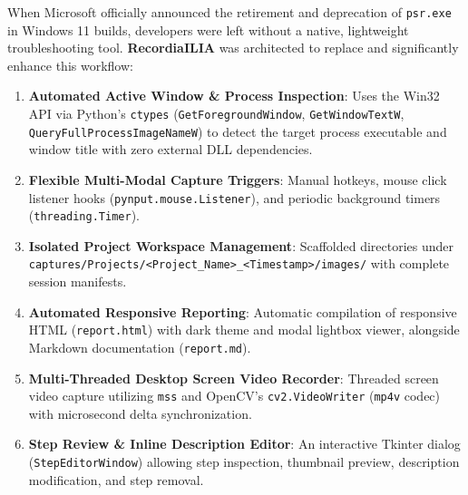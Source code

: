 \documentclass[10pt,a4paper]{article}
\begin{document}
When Microsoft officially announced the retirement and deprecation of \texttt{psr.exe} in Windows 11 builds, developers were left without a native, lightweight troubleshooting tool. \textbf{RecordiaILIA} was architected to replace and significantly enhance this workflow:
\begin{enumerate}
    \item \textbf{Automated Active Window \& Process Inspection}: Uses the Win32 API via Python's \texttt{ctypes} (\texttt{GetForegroundWindow}, \texttt{GetWindowTextW}, \texttt{QueryFullProcessImageNameW}) to detect the target process executable and window title with zero external DLL dependencies.
    \item \textbf{Flexible Multi-Modal Capture Triggers}: Manual hotkeys, mouse click listener hooks (\texttt{pynput.mouse.Listener}), and periodic background timers (\texttt{threading.Timer}).
    \item \textbf{Isolated Project Workspace Management}: Scaffolded directories under \texttt{captures/Projects/<Project\_Name>\_<Timestamp>/images/} with complete session manifests.
    \item \textbf{Automated Responsive Reporting}: Automatic compilation of responsive HTML (\texttt{report.html}) with dark theme and modal lightbox viewer, alongside Markdown documentation (\texttt{report.md}).
    \item \textbf{Multi-Threaded Desktop Screen Video Recorder}: Threaded screen video capture utilizing \texttt{mss} and OpenCV's \texttt{cv2.VideoWriter} (\texttt{mp4v} codec) with microsecond delta synchronization.
    \item \textbf{Step Review \& Inline Description Editor}: An interactive Tkinter dialog (\texttt{StepEditorWindow}) allowing step inspection, thumbnail preview, description modification, and step removal.
\end{enumerate}
\end{document}
